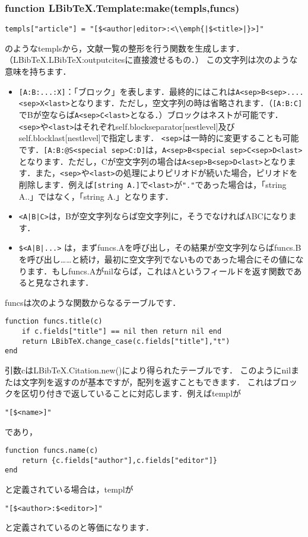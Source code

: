 \documentclass[dvipdfmx,a4paper]{jsarticle}
\begin{document}
\subsubsection{function LBibTeX.Template:make(templs,funcs)}
\begin{lstlisting}
templs["article"] = "[$<author|editor>:<\\emph{|$<title>|}>]"
\end{lstlisting}
のようなtemplsから，文献一覧の整形を行う関数を生成します．（LBibTeX.LBibTeX:outputcitesに直接渡せるもの．）
この文字列は次のような意味を持ちます．
\begin{itemize}
\item \verb|[A:B:...:X]|：「ブロック」を表します．最終的にはこれは\verb|A<sep>B<sep>....<sep>X<last>|となります．ただし，空文字列の時は省略されます．（\verb|[A:B:C]|でBが空ならば\verb|A<sep>C<last>|となる．）ブロックはネストが可能です．\verb|<sep>|や\verb|<last>|はそれぞれself.blockseparator[nestlevel]及びself.blocklast[nestlevel]で指定します．
\verb|<sep>|は一時的に変更することも可能です．\verb|[A:B:@S<special sep>C:D]|は，\verb|A<sep>B<special sep>C<sep>D<last>|となります．ただし，Cが空文字列の場合は\verb|A<sep>B<sep>D<last>|となります．また，\verb|<sep>|や\verb|<last>|の処理によりピリオドが続いた場合，ピリオドを削除します．例えば\verb|[string A.]|で\verb|<last>|が\verb|"."|であった場合は，「string A..」ではなく，「string A.」となります．
\item \verb:<A|B|C>:は，Bが空文字列ならば空文字列に，そうでなければABCになります．
\item \verb:$<A|B|...>:
は，まずfuncs.Aを呼び出し，その結果が空文字列ならばfuncs.Bを呼び出し……と続け，最初に空文字列でないものであった場合にその値になります．もしfuncs.Aがnilならば，これはAというフィールドを返す関数であると見なされます．
\end{itemize}
funcsは次のような関数からなるテーブルです．
\begin{lstlisting}
function funcs.title(c)
	if c.fields["title"] == nil then return nil end
	return LBibTeX.change_case(c.fields["title"],"t")
end
\end{lstlisting}
引数cはLBibTeX.Citation.new()により得られたテーブルです．
このようにnilまたは文字列を返すのが基本ですが，配列を返すこともできます．
これはブロックを区切り付きで返していることに対応します．例えばtemplが
\begin{lstlisting}
"[$<name>]"
\end{lstlisting}
であり，
\begin{lstlisting}
function funcs.name(c)
	return {c.fields["author"],c.fields["editor"]}
end
\end{lstlisting}
と定義されている場合は，templが
\begin{lstlisting}
"[$<author>:$<editor>]"
\end{lstlisting}
と定義されているのと等価になります．
\end{document}
